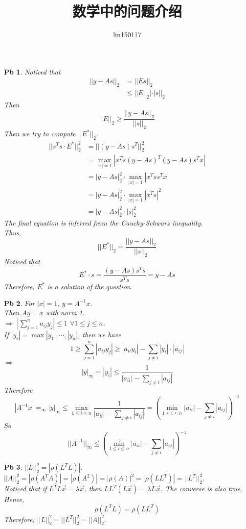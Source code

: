 \documentclass[a4paper,10pt]{article}
\title{数学中的问题介绍}
\author{lin150117}
\date{}
\newtheorem{num}{Pb}
\begin{document}
\maketitle
\newpage
\begin{num}
    Noticed that 
    \begin{align*}
        ||y-As||_2&=||Es||_2\\
        & \leq ||E||_2|\cdot|s||_2
    \end{align*}
    Then  \[||E||_2 \geq \frac{||y-As||_2}{||s||_2} \]
    Then we try to compute  $ ||E^*||_2 $.\\
    \begin{align*}
        ||s^Ts\cdot E^*||_2^2&=||(y-As)s^T||_2^2\\
        &=\max\limits_{|x|=1}|x^Ts(y-As)^T(y-As)s^Tx|\\
        &=|y-As|_2^2\cdot \max\limits_{|x|=1}|x^Tss^Tx|\\
        &=|y-As|_2^2\cdot\max\limits_{|x|=1}|x^Ts|^2\\
        &=|y-As|_2^2\cdot|s|_2^2
    \end{align*} 
    The final equation is inferred from the Cauchy-Schwarz inequality.\\
    Thus,
    \[||E^*||_2 = \frac{||y-As||_2}{||s||_2}\]
    Noticed that 
    \[E^*\cdot s=\frac{(y-As)s^Ts}{s^Ts}=y-As\]
    Therefore,  $ E^* $ is a solution of the question.
\end{num}
\begin{num}
    For  $ |x|=1 $,  $ y=A^{-1}x $.\\
    Then  $ Ay=x $ with norm 1.\\
     $ \Rightarrow  $  $ |\sum\limits_{j=1}^na_{ij}y_j| \leq 1 $ $ \forall 1 \leq j \leq n $.\\
     If  $ |y_i|=\max{|y_1|,\cdots,|y_n|} $, then we have 
     \[1 \geq \sum\limits_{j=1}^n |a_{ij}y_j| \geq |a_{ii}y_i|-\sum\limits_{j\not=i}|y_i|\cdot |a_{ij}|\]        
      $ \Rightarrow  $ 
      \[|y|_\infty=|y_i| \leq \frac{1 }{|a_{ii}|-\sum\limits_{j\not=i}|a_{ij}|}\]
      Therefore 
      \[|A^{-1}x|=_\infty|y|_\infty \leq \max\limits_{1 \leq i \leq n}\frac{1 }{|a_{ii}|-\sum\limits_{j\not=i}|a_{ij}|}=(\min\limits_{1 \leq i \leq n}|a_{ii}|-\sum\limits_{j\not=i}|a_{ij}|)^{-1}\]
      So  
      \[||A^{-1}||_\infty  \leq (\min\limits_{1 \leq i \leq n}|a_{ii}|-\sum\limits_{j\not=i}|a_{ij}|)^{-1}\] 
\end{num}
\begin{num}
     $ ||L||_2^2=|\rho(L^TL)| $.\\
      $ ||A||_2^2=|\rho(A^TA)|=|\rho(A^2)|=|\rho(A)|^2=|\rho(LL^T)|=||L^T||_2^2 $.\\
      Noticed that if  $ L^TL\vec{x}=\lambda \vec{x} $, then  $ LL^T(L\vec{x})=\lambda L\vec{x} $. The converse is also true. Hence, 
      \[\rho(L^TL)=\rho(LL^T)\]
      Therefore,  $ ||L||_2^2=||L^T||_2^2=||A||_2^2 $.      
\end{num}
\end{document}
